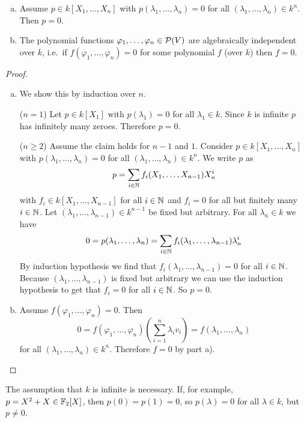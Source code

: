 \begin{lem}\leavevmode
 \begin{enumerate}[a)]
  \item
   Assume $p \in k[X_1, \dotsc, X_n]$ with $p(\lambda_1, \dotsc, \lambda_n) = 0$ for all $(\lambda_1,\dotsc,\lambda_n) \in k^n$. Then $p = 0$.
  \item
   The polynomial functions $\varphi_1, \dotsc, \varphi_n \in \mathcal{P}(V)$ are algebraically independent over $k$, i.e.\ if $f(\varphi_1, \dotsc, \varphi_n) = 0$ for some polynomial $f$ (over $k$) then $f = 0$.
 \end{enumerate}
\end{lem}
\begin{proof}\leavevmode
 \begin{enumerate}[a)]
  \item
   We show this by induction over $n$.
   
   ($n = 1$) Let $p \in k[X_1]$ with $p(\lambda_1) = 0$ for all $\lambda_1 \in k$. Since $k$ is infinite $p$ has infinitely many zeroes. Therefore $p = 0$.
   
   ($n \geq 2$) Assume the claim holds for $n-1$ and $1$. Consider $p \in k[X_1, \dotsc, X_n]$ with $p(\lambda_1, \dotsc, \lambda_n) = 0$ for all $(\lambda_1, \dotsc, \lambda_n) \in k^n$. We write $p$ as
   \[
    p = \sum_{i \in \mathbb{N}} f_i(X_1, \dotsc, X_{n-1}) X_n^i
   \]
   with $f_i \in k[X_1, \dotsc, X_{n-1}]$ for all $i \in \mathbb{N}$ and $f_i = 0$ for all but finitely many $i \in \mathbb{N}$. Let $(\lambda_1, \dotsc, \lambda_{n-1}) \in k^{n-1}$ be fixed but arbitrary. For all $\lambda_n \in k$ we have
   \[
    0 = p(\lambda_1, \dotsc, \lambda_n) = \sum_{i \in \mathbb{N}} f_i(\lambda_1, \dotsc, \lambda_{n-1}) \lambda_n^i
   \]
   By induction hypothesis we find that $f_i(\lambda_1, \dotsc, \lambda_{n-1}) = 0$ for all $i \in \mathbb{N}$. Because $(\lambda_1, \dotsc, \lambda_{n-1})$ is fixed but arbitrary we can use the induction hypothesis to get that $f_i = 0$ for all $i \in \mathbb{N}$. So $p = 0$.
  \item
   Assume $f(\varphi_1, \dotsc, \varphi_n) = 0$. Then
   \[
    0 = f(\varphi_1, \dotsc, \varphi_n)\left(\sum_{i=1}^n \lambda_i v_i\right) = f(\lambda_1, \dotsc, \lambda_n)
   \]
   for all $(\lambda_1, \dotsc, \lambda_n) \in k^n$. Therefore $f = 0$ by part a). \qedhere
 \end{enumerate}
\end{proof}

\begin{warn}
 The assumption that $k$ is infinite is necessary. If, for example, $p = X^2+X \in \mathbb{F}_2[X]$, then $p(0) = p(1) = 0$, so $p(\lambda)=0$ for all $\lambda \in k$, but $p \neq 0$.
\end{warn}


